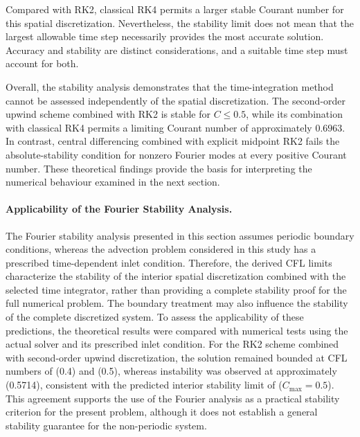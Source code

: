 Compared with RK2, classical RK4 permits a larger stable Courant number for this spatial discretization. Nevertheless, the stability limit does not mean that the largest allowable time step necessarily provides the most accurate solution. Accuracy and stability are distinct considerations, and a suitable time step must account for both.

Overall, the stability analysis demonstrates that the time-integration method cannot be assessed independently of the spatial discretization. The second-order upwind scheme combined with RK2 is stable for $C\leq 0.5$, while its combination with classical RK4 permits a limiting Courant number of approximately $0.6963$. In contrast, central differencing combined with explicit midpoint RK2 fails the absolute-stability condition for nonzero Fourier modes at every positive Courant number. These theoretical findings provide the basis for interpreting the numerical behaviour examined in the next section.

\paragraph{Applicability of the Fourier Stability Analysis.}
The Fourier stability analysis presented in this section assumes periodic boundary conditions, whereas the advection problem considered in this study has a prescribed time-dependent inlet condition. Therefore, the derived CFL limits characterize the stability of the interior spatial discretization combined with the selected time integrator, rather than providing a complete stability proof for the full numerical problem. The boundary treatment may also influence the stability of the complete discretized system. To assess the applicability of these predictions, the theoretical results were compared with numerical tests using the actual solver and its prescribed inlet condition. For the RK2 scheme combined with second-order upwind discretization, the solution remained bounded at CFL numbers of (0.4) and (0.5), whereas instability was observed at approximately (0.5714), consistent with the predicted interior stability limit of ($C_{\max}=0.5$). This agreement supports the use of the Fourier analysis as a practical stability criterion for the present problem, although it does not establish a general stability guarantee for the non-periodic system.
